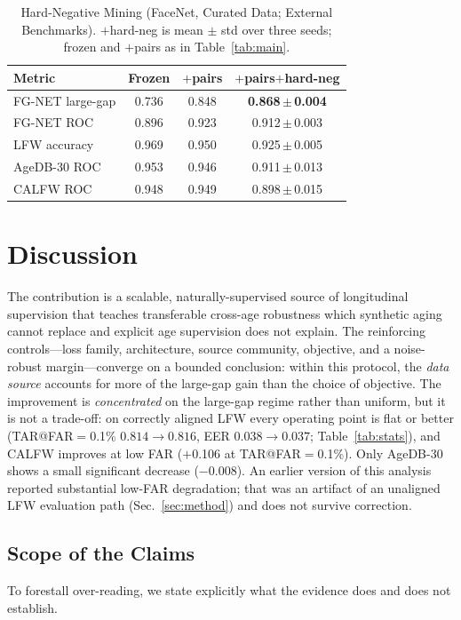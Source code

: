 \documentclass[journal]{IEEEtran}
\begin{document}
\begin{table}[!t]
\renewcommand{\arraystretch}{1.2}
\caption{Hard-Negative Mining (FaceNet, Curated Data; External Benchmarks). $+$hard-neg is mean $\pm$ std over three seeds; frozen and $+$pairs as in Table~\ref{tab:main}.}
\label{tab:hardneg}
\centering
\footnotesize
\begin{tabular}{@{}lccc@{}}
\toprule
Metric & Frozen & $+$pairs & $+$pairs$+$hard-neg \\
\midrule
FG-NET large-gap & 0.736 & 0.848 & \textbf{0.868\,$\pm$\,0.004} \\
FG-NET ROC & 0.896 & 0.923 & 0.912\,$\pm$\,0.003 \\
LFW accuracy & 0.969 & 0.950 & 0.925\,$\pm$\,0.005 \\
AgeDB-30 ROC & 0.953 & 0.946 & 0.911\,$\pm$\,0.013 \\
CALFW ROC & 0.948 & 0.949 & 0.898\,$\pm$\,0.015 \\
\bottomrule
\end{tabular}
\end{table}

\section{Discussion}\label{sec:discussion}
The contribution is a scalable, naturally-supervised source of longitudinal supervision that teaches transferable cross-age robustness which synthetic aging cannot replace and explicit age supervision does not explain. The reinforcing controls---loss family, architecture, source community, objective, and a noise-robust margin---converge on a bounded conclusion: within this protocol, the \emph{data source} accounts for more of the large-gap gain than the choice of objective. The improvement is \emph{concentrated} on the large-gap regime rather than uniform, but it is not a trade-off: on correctly aligned LFW every operating point is flat or better (TAR@FAR$=$0.1\% $0.814 \rightarrow 0.816$, EER $0.038 \rightarrow 0.037$; Table~\ref{tab:stats}), and CALFW improves at low FAR ($+$0.106 at TAR@FAR$=$0.1\%). Only AgeDB-30 shows a small significant decrease ($-$0.008). An earlier version of this analysis reported substantial low-FAR degradation; that was an artifact of an unaligned LFW evaluation path (Sec.~\ref{sec:method}) and does not survive correction.

\subsection{Scope of the Claims}\label{sec:scope}
To forestall over-reading, we state explicitly what the evidence does and does not establish.
\end{document}
